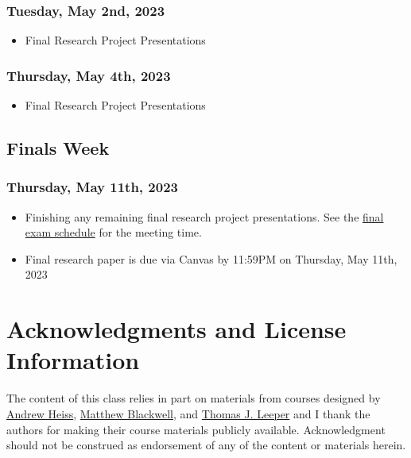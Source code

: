 \documentclass[12pt,]{article}
\providecommand{\tightlist}{%
  \setlength{\itemsep}{0pt}\setlength{\parskip}{0pt}}
\begin{document}
\hypertarget{tuesday-may-2nd-2023}{%
\subsubsection{Tuesday, May 2nd, 2023}\label{tuesday-may-2nd-2023}}

\begin{itemize}
\tightlist
\item
  Final Research Project Presentations
\end{itemize}

\hypertarget{thursday-may-4th-2023}{%
\subsubsection{Thursday, May 4th, 2023}\label{thursday-may-4th-2023}}

\begin{itemize}
\tightlist
\item
  Final Research Project Presentations
\end{itemize}

\hypertarget{finals-week}{%
\subsection{Finals Week}\label{finals-week}}

\hypertarget{thursday-may-11th-2023}{%
\subsubsection{Thursday, May 11th, 2023}\label{thursday-may-11th-2023}}

\begin{itemize}
\item
  Finishing any remaining final research project presentations. See the
  \href{https://registrar.unt.edu/exams/final-exam-schedule/spring}{final
  exam schedule} for the meeting time.
\item
  Final research paper is due via Canvas by 11:59PM on Thursday, May
  11th, 2023
\end{itemize}

\hypertarget{acknowledgments-and-license-information}{%
\section{Acknowledgments and License
Information}\label{acknowledgments-and-license-information}}

\noindent The content of this class relies in part on materials from
courses designed by
\href{https://github.com/andrewheiss/evalsp23.classes.andrewheiss.com}{Andrew
Heiss}, \href{https://github.com/mattblackwell/gov2003-f21-site}{Matthew
Blackwell}, and \href{https://github.com/leeper/designcourse}{Thomas J.
Leeper} and I thank the authors for making their course materials
publicly available. Acknowledgment should not be construed as
endorsement of any of the content or materials herein.
\end{document}
